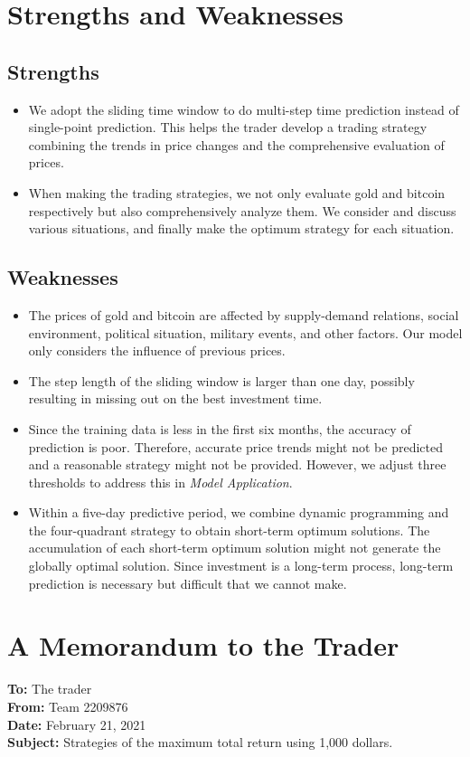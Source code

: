 \documentclass[12pt]{article}
\begin{document}
\section{Strengths and Weaknesses}
\subsection{Strengths}
\begin{itemize}
\item We adopt the sliding time window to do multi-step time prediction instead of single-point prediction. This helps the trader develop a trading strategy combining the trends in price changes and the comprehensive evaluation of prices.
\item When making the trading strategies, we not only evaluate gold and bitcoin respectively but also comprehensively analyze them. We consider and discuss various situations, and finally make the optimum strategy for each situation.
\end{itemize}
\subsection{Weaknesses}
\begin{itemize}
\item The prices of gold and bitcoin are affected by supply-demand relations, social environment,  political situation, military events, and other factors. Our model only considers the influence of previous prices.
\item The step length of the sliding window is larger than one day, possibly resulting in missing out on the best investment time.
\item Since the training data is less in the first six months, the accuracy of prediction is poor. Therefore, accurate price trends might not be predicted and a reasonable strategy might not be provided. However, we adjust three thresholds to address this in \emph{Model Application}. 
\item Within a five-day predictive period, we combine dynamic programming and the four-quadrant strategy to obtain short-term optimum solutions. The accumulation of each short-term optimum solution might not generate the globally optimal solution. Since investment is a long-term process, long-term prediction is necessary but difficult that we cannot make.
\end{itemize}

\newpage
\section{A Memorandum to the Trader}
\noindent
\textbf{To: }The trader\\
\textbf{From: }Team 2209876\\
\textbf{Date: }February 21, 2021\\
\textbf{Subject: }Strategies of the maximum total return using 1,000 dollars.
\end{document}
